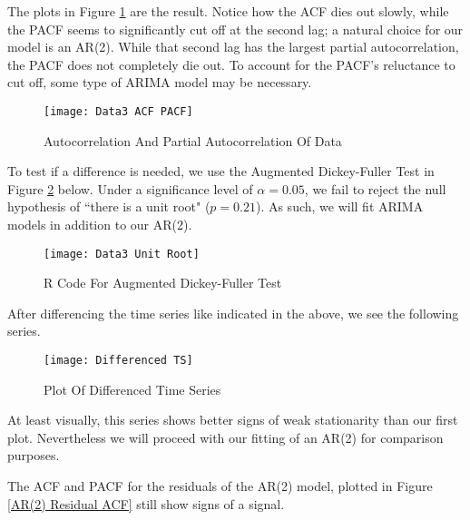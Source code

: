 \documentclass[12pt, letterpaper]{article}
\theoremstyle{definition}
\numberwithin{equation}{section}
\newcommand{\+}[1]{+_{\scalebox{.375}{#1}}}
\newcommand{\1}{\mathbbm{1}}
\begin{document}
The plots in Figure \ref{Data3 ACF PACF} are the result. Notice how the ACF dies out slowly, while the PACF seems to significantly cut off at the second lag; a natural choice for our model is an AR(2). While that second lag has the largest partial autocorrelation, the PACF does not completely die out. To account for the PACF's reluctance to cut off, some type of ARIMA model may be necessary.

\begin{figure}[H]
	\centering
	\texttt{[image: Data3 ACF PACF]}
	\caption{Autocorrelation And Partial Autocorrelation Of Data}
	\label{Data3 ACF PACF}
\end{figure}

To test if a difference is needed, we use the Augmented Dickey-Fuller Test in Figure \ref{ADF Root} below. Under a significance level of $\alpha=0.05$, we fail to reject the null hypothesis of ``there is a unit root" ($p=0.21$). As such, we will fit ARIMA models in addition to our AR(2).

\begin{figure}[H]
	\centering
	\texttt{[image: Data3 Unit Root]}
	\caption{R Code For Augmented Dickey-Fuller Test}
	\label{ADF Root}
\end{figure}




\vspace{\baselineskip}
\noindent\textbf{}
\vspace{\baselineskip}

After differencing the time series like indicated in the above, we see the following series.

\begin{figure}[H]
	\centering
	\texttt{[image: Differenced TS]}
	\caption{Plot Of Differenced Time Series}
	\label{Differenced TS}	
\end{figure}

At least visually, this series shows better signs of weak stationarity than our first plot. Nevertheless we will proceed with our fitting of an AR(2) for comparison purposes.
\vspace{\baselineskip}

The ACF and PACF for the residuals of the AR(2) model, plotted in Figure \ref{AR(2) Residual ACF} still show signs of a signal.
\end{document}
